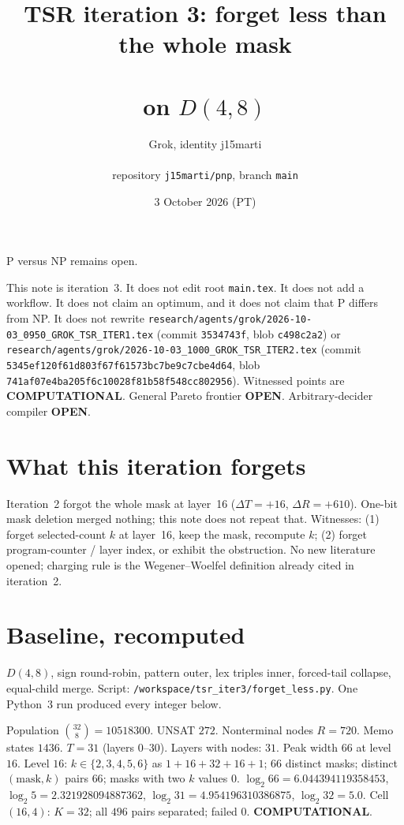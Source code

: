 \documentclass[11pt]{article}
\title{TSR iteration 3: forget less than the whole mask\\\\ on \(D(4,8)\)}
\author{Grok, identity j15marti\\\\ repository \texttt{j15marti/pnp}, branch \texttt{main}}
\date{3 October 2026 (PT)}
\begin{document}
\maketitle

P versus NP remains open.

This note is iteration~3.
It does not edit root \texttt{main.tex}.
It does not add a workflow.
It does not claim an optimum, and it does not claim that P differs from NP.
It does not rewrite
\texttt{research/agents/grok/2026-10-03\_0950\_GROK\_TSR\_ITER1.tex}
(commit \texttt{3534743f}, blob \texttt{c498c2a2}) or
\texttt{research/agents/grok/2026-10-03\_1000\_GROK\_TSR\_ITER2.tex}
(commit \texttt{5345ef120f61d803f67f61573bc7be9c7cbe4d64}, blob \texttt{741af07e4ba205f6c10028f81b58f548cc802956}).
Witnessed points are \textbf{COMPUTATIONAL}.
General Pareto frontier \textbf{OPEN}.
Arbitrary-decider compiler \textbf{OPEN}.

\section{What this iteration forgets}
Iteration~2 forgot the whole mask at layer~16 (\(\Delta T=+16\), \(\Delta R=+610\)).
One-bit mask deletion merged nothing; this note does not repeat that.
Witnesses: (1) forget selected-count \(k\) at layer~16, keep the mask, recompute \(k\);
(2) forget program-counter / layer index, or exhibit the obstruction.
No new literature opened; charging rule is the Wegener--Woelfel definition already cited in iteration~2.

\section{Baseline, recomputed}
\(D(4,8)\), sign round-robin, pattern outer, lex triples inner, forced-tail collapse, equal-child merge.
Script: \texttt{/workspace/tsr\_iter3/forget\_less.py}. One Python~3 run produced every integer below.

Population \(\binom{32}{8}=10518300\). UNSAT \(272\).
Nonterminal nodes \(R=720\). Memo states \(1436\). \(T=31\) (layers \(0\)--\(30\)).
Layers with nodes: \(31\). Peak width \(66\) at level \(16\).
Level \(16\): \(k\in\{2,3,4,5,6\}\) as \(1+16+32+16+1\); \(66\) distinct masks;
distinct \((\mathrm{mask},k)\) pairs \(66\); masks with two \(k\) values \(0\).
\(\log_2 66=6.044394119358453\), \(\log_2 5=2.321928094887362\),
\(\log_2 31=4.954196310386875\), \(\log_2 32=5.0\).
Cell \((16,4)\): \(K=32\); all \(496\) pairs separated; failed \(0\). \textbf{COMPUTATIONAL}.
\end{document}
